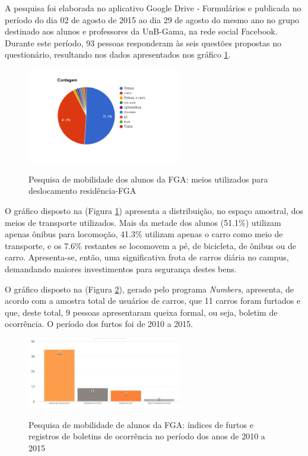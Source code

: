 A pesquisa foi elaborada no aplicativo Google Drive - Formulários e publicada no período do dia 02 de agosto de 2015 ao dia 29 de agosto do mesmo ano no grupo destinado aos alunos e professores da UnB-Gama, na rede social Facebook. Durante este período, 93 pessoas responderam às seis questões propostas no questionário, resultando nos dados apresentados nos gráfico \ref{img:resultadoquestionario}.

\begin{figure}[htp]
	\centering
	\caption{Pesquisa de mobilidade dos alunos da FGA: meios utilizados para deslocamento residência-FGA}
	\includegraphics[width=0.6\textwidth]{figuras/resultadoquestionario}
	\label{img:resultadoquestionario}
\end{figure}

O gráfico disposto na (Figura \ref{img:resultadoquestionario}) apresenta a distribuição, no espaço amostral, dos meios  de transporte utilizados. Mais da metade dos alunos (51.1\%) utilizam apenas ônibus para locomoção, 41.3\% utilizam apenas o carro como meio de transporte, e os 7.6\% restantes se locomovem a pé, de bicicleta, de ônibus ou de carro. Apresenta-se, então, uma significativa frota de carros diária no campus, demandando maiores investimentos para segurança destes bens.

O gráfico disposto na (Figura \ref{img:resultadoquestionario2}), gerado pelo programa \emph{Numbers}, apresenta, de acordo com a amostra total de usuários de carros, que 11 carros foram furtados e que, deste total, 9 pessoas apresentaram queixa formal, ou seja, boletim de ocorrência. O período dos furtos foi de 2010 a 2015.

\begin{figure}[htp]
	\centering
	\caption{Pesquisa de mobilidade de alunos da FGA: índices de furtos e registros de boletins de ocorrência no período dos anos de 2010 a 2015}
	\includegraphics[width=0.6\textwidth]{figuras/resultadoquestionario2}
	\label{img:resultadoquestionario2}
\end{figure}

